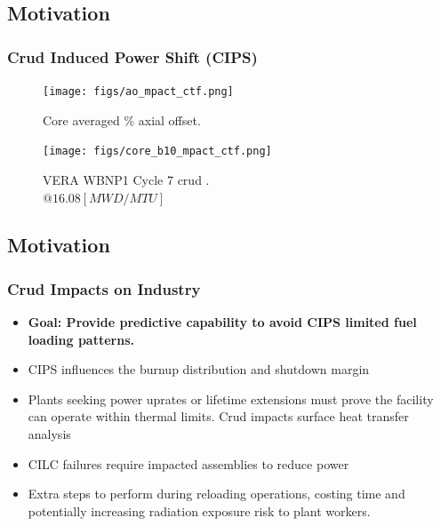 \documentclass[t, pdftex]{beamer}
\begin{document}
\subsection*{Motivation}
\begin{frame}
    \frametitle{Crud Induced Power Shift (CIPS)}
    \vspace{-22pt}
    \begin{figure}
        \centering
        \begin{minipage}{.5\textwidth}
            \centering
            \texttt{[image: figs/ao\_mpact\_ctf.png]}
            \caption{Core averaged \% axial offset.}
        \end{minipage}%
        \begin{minipage}{.5\textwidth}
            \centering
            \texttt{[image: figs/core\_b10\_mpact\_ctf.png]}
            \caption{VERA WBNP1 Cycle 7 crud . \\ $@ 16.08 [MWD/MTU]$}
        \end{minipage}
    \end{figure}
 \cite{collins2015}
\end{frame}

\subsection*{Motivation}
\begin{frame}
\frametitle{Crud Impacts on Industry}
\vspace{-8pt}
\begin{itemize}
	\item \textbf{Goal: Provide predictive capability to avoid CIPS limited fuel loading patterns.}
    \item CIPS influences the burnup distribution and shutdown margin \cite{lange2017}
    \item Plants seeking power uprates or lifetime extensions must prove the facility can operate within thermal limits.  Crud impacts surface heat transfer analysis
    \item CILC failures require impacted assemblies to reduce power
    \item Extra steps to perform during reloading operations, costing time and potentially increasing radiation exposure risk to plant workers.
\end{itemize}

\end{frame}
\end{document}

